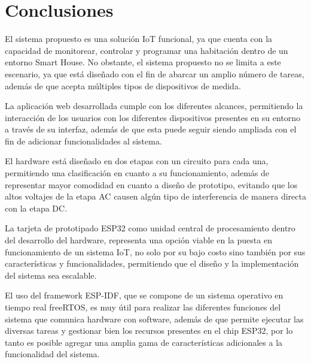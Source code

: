 \section{Conclusiones}
\begin{frame}
	El sistema propuesto es una solución IoT funcional, ya que cuenta con la capacidad de monitorear, controlar y programar una habitación dentro de un entorno Smart House. No obstante, el sistema propuesto no se limita a este escenario, ya que está diseñado con el fin de abarcar un amplio número de tareas, además de que acepta múltiples tipos de dispositivos de medida.\newline
	
	La aplicación web desarrollada cumple con los diferentes alcances, permitiendo la interacción de los usuarios con los diferentes dispositivos presentes en su entorno a través de su interfaz, además de que esta puede seguir siendo ampliada con el fin de adicionar funcionalidades al sistema.\newline
	
	El hardware está diseñado en dos etapas con un circuito para cada una, permitiendo una clasificación en cuanto a su funcionamiento, además de representar mayor comodidad en cuanto a diseño de prototipo, evitando que los altos voltajes de la etapa AC causen algún tipo de interferencia de manera directa con la etapa DC. \\
\end{frame}

\begin{frame}
	La tarjeta de prototipado ESP32 como unidad central de procesamiento dentro del desarrollo del hardware, representa una opción viable en la puesta en funcionamiento de un sistema IoT, no solo por su bajo costo sino también por sus características y funcionalidades, permitiendo que el diseño y la implementación del sistema sea escalable.\newline
	
	El uso del framework ESP-IDF, que se compone de un sistema operativo en tiempo real freeRTOS, es muy útil para realizar las diferentes funciones del sistema que comunica hardware con software, además de que permite ejecutar las diversas tareas y gestionar bien los recursos presentes en el chip ESP32, por lo tanto es posible agregar una amplia gama de características adicionales a la funcionalidad del sistema.\\
	
\end{frame}